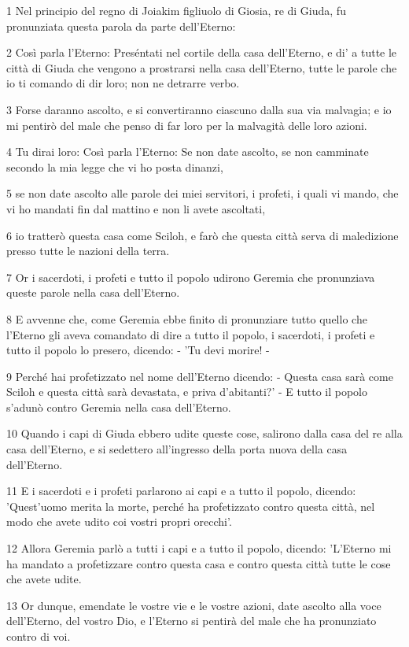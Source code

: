 \par 1 Nel principio del regno di Joiakim figliuolo di Giosia, re di Giuda, fu pronunziata questa parola da parte dell'Eterno:
\par 2 Così parla l'Eterno: Preséntati nel cortile della casa dell'Eterno, e di' a tutte le città di Giuda che vengono a prostrarsi nella casa dell'Eterno, tutte le parole che io ti comando di dir loro; non ne detrarre verbo.
\par 3 Forse daranno ascolto, e si convertiranno ciascuno dalla sua via malvagia; e io mi pentirò del male che penso di far loro per la malvagità delle loro azioni.
\par 4 Tu dirai loro: Così parla l'Eterno: Se non date ascolto, se non camminate secondo la mia legge che vi ho posta dinanzi,
\par 5 se non date ascolto alle parole dei miei servitori, i profeti, i quali vi mando, che vi ho mandati fin dal mattino e non li avete ascoltati,
\par 6 io tratterò questa casa come Sciloh, e farò che questa città serva di maledizione presso tutte le nazioni della terra.
\par 7 Or i sacerdoti, i profeti e tutto il popolo udirono Geremia che pronunziava queste parole nella casa dell'Eterno.
\par 8 E avvenne che, come Geremia ebbe finito di pronunziare tutto quello che l'Eterno gli aveva comandato di dire a tutto il popolo, i sacerdoti, i profeti e tutto il popolo lo presero, dicendo: - 'Tu devi morire! -
\par 9 Perché hai profetizzato nel nome dell'Eterno dicendo: - Questa casa sarà come Sciloh e questa città sarà devastata, e priva d'abitanti?' - E tutto il popolo s'adunò contro Geremia nella casa dell'Eterno.
\par 10 Quando i capi di Giuda ebbero udite queste cose, salirono dalla casa del re alla casa dell'Eterno, e si sedettero all'ingresso della porta nuova della casa dell'Eterno.
\par 11 E i sacerdoti e i profeti parlarono ai capi e a tutto il popolo, dicendo: 'Quest'uomo merita la morte, perché ha profetizzato contro questa città, nel modo che avete udito coi vostri propri orecchi'.
\par 12 Allora Geremia parlò a tutti i capi e a tutto il popolo, dicendo: 'L'Eterno mi ha mandato a profetizzare contro questa casa e contro questa città tutte le cose che avete udite.
\par 13 Or dunque, emendate le vostre vie e le vostre azioni, date ascolto alla voce dell'Eterno, del vostro Dio, e l'Eterno si pentirà del male che ha pronunziato contro di voi.
